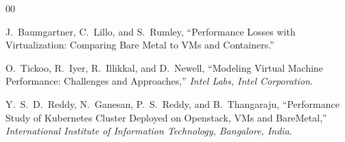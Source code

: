 \documentclass[conference]{IEEEtran}
\begin{document}
\begin{thebibliography}{00}

J.~Baumgartner, C.~Lillo, and S.~Rumley, ``Performance Losses with Virtualization: Comparing Bare Metal to VMs and Containers.''

O.~Tickoo, R.~Iyer, R.~Illikkal, and D.~Newell, ``Modeling Virtual Machine Performance: Challenges and Approaches,'' \textit{Intel Labs, Intel Corporation}.

Y.~S.~D.~Reddy, N.~Ganesan, P.~S.~Reddy, and B.~Thangaraju, ``Performance Study of Kubernetes Cluster Deployed on Openstack, VMs and BareMetal,'' \textit{International Institute of Information Technology, Bangalore, India}.

\end{thebibliography}
\end{document}
